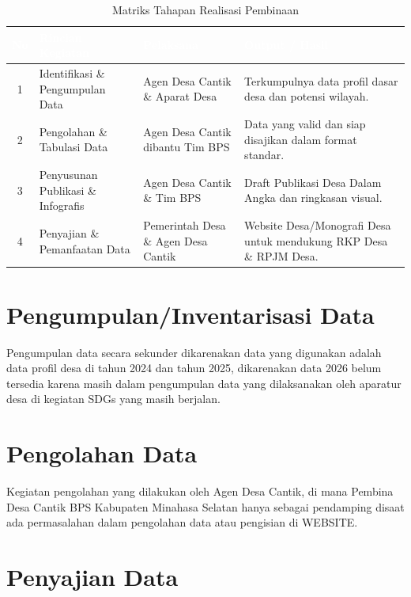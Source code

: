 \begin{table}[htbp]
\centering
\small
\caption{Matriks Tahapan Realisasi Pembinaan}
\label{tab:matriks_realisasi}
\vspace{0.2cm}
\begin{tabularx}{\textwidth}{|c|Y|Y|Y|}
\hline
{}
\textcolor{white}{\textbf{No}} & \centering\textcolor{white}{\textbf{Rincian Kegiatan}} & \centering\textcolor{white}{\textbf{Pelaksana}} & \centering\textcolor{white}{\textbf{Output / Hasil}} \tabularnewline
\hline
{}
1 & Identifikasi \& Pengumpulan Data & Agen Desa Cantik \& Aparat Desa & Terkumpulnya data profil dasar desa dan potensi wilayah. \tabularnewline
\hline
{}
2 & Pengolahan \& Tabulasi Data & Agen Desa Cantik dibantu Tim BPS & Data yang valid dan siap disajikan dalam format standar. \tabularnewline
\hline
{}
3 & Penyusunan Publikasi \& Infografis & Agen Desa Cantik \& Tim BPS & Draft Publikasi Desa Dalam Angka dan ringkasan visual. \tabularnewline
\hline
{}
4 & Penyajian \& Pemanfaatan Data & Pemerintah Desa \& Agen Desa Cantik & Website Desa/Monografi Desa untuk mendukung RKP Desa \& RPJM Desa. \tabularnewline
\hline
\end{tabularx}
\end{table}

\section{Pengumpulan/Inventarisasi Data}

Pengumpulan data secara sekunder dikarenakan data yang digunakan adalah data profil desa di tahun 2024 dan tahun 2025, dikarenakan data 2026 belum tersedia karena masih dalam pengumpulan data yang dilaksanakan oleh aparatur desa di kegiatan SDGs yang masih berjalan.

\section{Pengolahan Data}

Kegiatan pengolahan yang dilakukan oleh Agen Desa Cantik, di mana Pembina Desa Cantik BPS Kabupaten Minahasa Selatan hanya sebagai pendamping disaat ada permasalahan dalam pengolahan data atau pengisian di WEBSITE.

\section{Penyajian Data}

